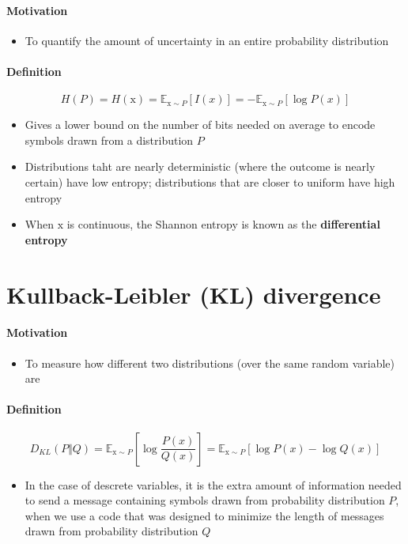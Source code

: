 \documentclass[12pt, a4paper]{article}
\def\bbE{\mathbb{E}}
\def\rmx{\mathrm{x}}
\begin{document}
\paragraph{Motivation}
\begin{itemize}
    \item To quantify the amount of uncertainty in an entire probability distribution
\end{itemize}

\paragraph{Definition}
\[
    H(P) = H(\rmx) = \bbE_{\rmx \sim P} [I(x)] = -\mathbb{E}_{\rmx \sim P}[\log P(x)]
\]
\begin{itemize}
    \item Gives a lower bound on the number of bits needed on average to encode symbols drawn from a distribution $P$
    \item Distributions taht are nearly deterministic (where the outcome is nearly certain) have low entropy; distributions that are closer to uniform have high entropy
    \item When $\rmx$ is continuous, the Shannon entropy is known as the \textbf{differential entropy}
\end{itemize}


\section{Kullback-Leibler (KL) divergence}
\paragraph{Motivation}
\begin{itemize}
    \item To measure how different two distributions (over the same random variable) are
\end{itemize}

\paragraph{Definition}
\[
    D_{KL}(P \Vert Q) = \bbE_{\rmx \sim P} \left[ \log \frac{P(x)}{Q(x)} \right] = \bbE_{\rmx \sim P} [\log P(x) - \log Q(x)]
\]
\begin{itemize}
    \item In the case of descrete variables, it is the extra amount of information needed to send a message containing symbols drawn from probability distribution $P$, when we use a code that was designed to minimize the length of messages drawn from probability distribution $Q$
\end{itemize}
\end{document}
